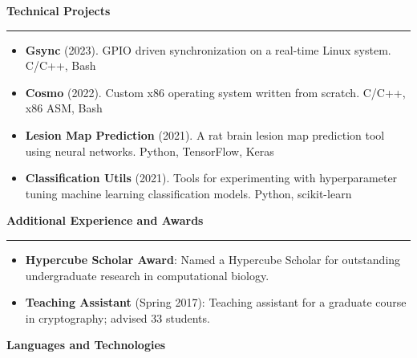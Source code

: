 \documentclass[10pt,letterpaper]{article}
\begin{document}
\medskip

\begin{large}
    \textbf{Technical Projects}
\end{large}

\smallskip \hrule \smallskip

\begin{itemize}[topsep=0pt]
    \setlength\itemsep{0.2em}
    \item \textbf{Gsync} (2023). GPIO driven synchronization on a real-time
                                 Linux system. C/C++, Bash
    \item \textbf{Cosmo} (2022). Custom x86 operating system written from
                                 scratch. C/C++, x86 ASM, Bash
    \item \textbf{Lesion Map Prediction} (2021). A rat brain lesion map
                                                 prediction tool using neural
                                                 networks.
                                                 Python, TensorFlow, Keras
    \item \textbf{Classification Utils} (2021). Tools for experimenting with
                                                hyperparameter tuning machine
                                                learning classification models.
                                                Python, scikit-learn
\end{itemize}

\medskip

\begin{large}
    \textbf{Additional Experience and Awards}
\end{large}

\smallskip \hrule \smallskip

\begin{itemize}[topsep=0pt]
    \setlength\itemsep{0.2em}
    \item \textbf{Hypercube Scholar Award}: Named a Hypercube Scholar for
          outstanding undergraduate research in computational biology.
    \item \textbf{Teaching Assistant} (Spring 2017): Teaching assistant for a
          graduate course in cryptography; advised 33 students.
\end{itemize}

\medskip

\begin{large}
    \textbf{Languages and Technologies}
\end{large}
\end{document}
